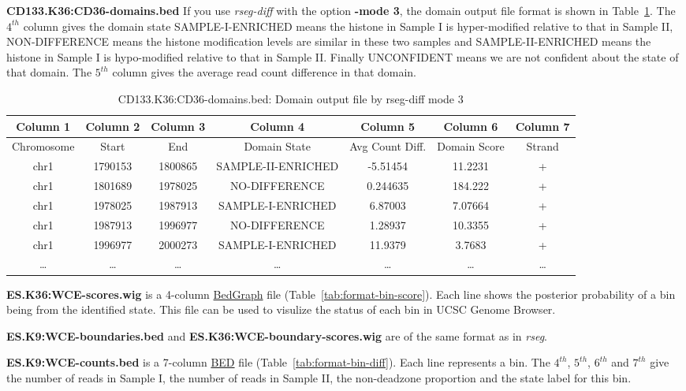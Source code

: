 \documentclass[11pt]{report}
\begin{document}
\textbf{CD133.K36:CD36-domains.bed} If you use \textit{rseg-diff} with the
option \textbf{-mode 3}, the domain output file format is shown in
Table~\ref{tab:format-domain-diff}. The $4^{th}$ column gives the domain state
SAMPLE-I-ENRICHED means the histone in Sample I is hyper-modified relative to
that in Sample II, NON-DIFFERENCE means the histone modification levels are
similar in these two samples and SAMPLE-II-ENRICHED means the histone in Sample
I is hypo-modified relative to that in Sample II. Finally UNCONFIDENT means we
are not confident about the state of that domain. The $5^{th}$ column gives the
average read count difference in that domain. 

\begin{table}[th]
  \centering
  \begin{tabular}{c c c c c c c}
Column 1 & Column 2 & Column 3 &  Column 4 & Column 5 &  Column 6  &
Column 7 \\
\hline
Chromosome  & Start & End & Domain State &  Avg Count Diff.& Domain Score &  Strand \\
\hline
chr1&    1790153& 1800865& SAMPLE-II-ENRICHED &     -5.51454   &     11.2231& + \\
chr1&    1801689& 1978025& NO-DIFFERENCE &  0.244635     &   184.222& + \\
chr1&    1978025& 1987913& SAMPLE-I-ENRICHED &      6.87003& 7.07664& + \\
chr1&    1987913& 1996977& NO-DIFFERENCE &  1.28937& 10.3355& + \\
chr1&    1996977& 2000273& SAMPLE-I-ENRICHED &      11.9379 &3.7683 & + \\
\ldots & \ldots &\ldots &\ldots &\ldots &\ldots & \ldots\\ 
\hline
  \end{tabular}
  \caption{CD133.K36:CD36-domains.bed: Domain output file  by rseg-diff mode 3}
  \label{tab:format-domain-diff}
\end{table}


\textbf{ES.K36:WCE-scores.wig} is a 4-column
\href{http://genome.ucsc.edu/goldenPath/help/bedgraph.html}{BedGraph}
file (Table~\ref{tab:format-bin-score}). Each line shows the posterior
probability of a bin being from the identified state. This file can be
used to visulize the status of each bin in UCSC Genome Browser.

\textbf{ES.K9:WCE-boundaries.bed} and
\textbf{ES.K36:WCE-boundary-scores.wig} are of the same format as
in \textit{rseg}.

\textbf{ES.K9:WCE-counts.bed} is a 7-column
\href{http://genome.ucsc.edu/FAQ/FAQformat.html#format1}{BED} file
(Table~\ref{tab:format-bin-diff}). Each line represents a bin. The $4^{th}$,
$5^{th}$, $6^{th}$ and $7^{th}$ give the number of reads in Sample I, the number
of reads in Sample II, the non-deadzone proportion and the state label for this
bin.
\end{document}
